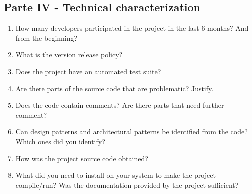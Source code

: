\subsection{Parte IV - Technical characterization}\label{parte-iv---caracterizauxe7uxe3o-tuxe9cnica}

\begin{enumerate}
\def\labelenumi{\arabic{enumi}.}
\setcounter{enumi}{17}
\item
   How many developers participated in the project in the last 6 months? And from the beginning?
\item
   What is the version release policy?
\item
   Does the project have an automated test suite?
\item
   Are there parts of the source code that are problematic? Justify.
\item
   Does the code contain comments? Are there parts that need further comment?
\item
   Can design patterns and architectural patterns be identified from the code? Which ones did you identify?
\item
   How was the project source code obtained?
\item
   What did you need to install on your system to make the project
   compile/run? Was the documentation provided by the project sufficient?
\end{enumerate}
